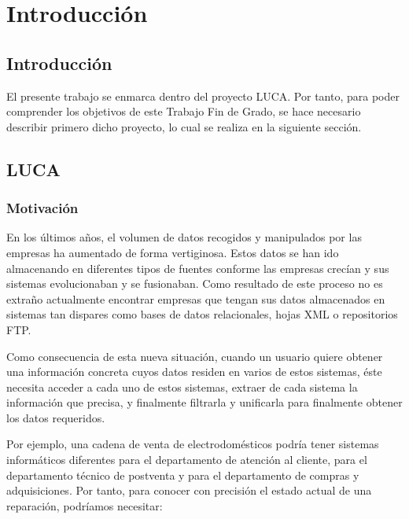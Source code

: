 \chapter{Introducción}

\minitoc
	
\section{Introducción}


El presente trabajo se enmarca dentro del proyecto LUCA. Por tanto, para poder comprender los objetivos de este Trabajo Fin de Grado, se hace necesario describir primero dicho proyecto, lo cual se realiza en la siguiente sección.

\section{LUCA}

\subsection{Motivación}

En los últimos años, el volumen de datos recogidos y manipulados por las empresas ha aumentado de forma vertiginosa. Estos datos se han ido almacenando en diferentes tipos de fuentes conforme las empresas crecían y sus sistemas evolucionaban y se fusionaban. Como resultado de  este proceso no es extraño actualmente encontrar empresas que tengan sus datos almacenados en sistemas tan dispares como bases de datos relacionales, hojas XML o repositorios FTP.

Como consecuencia de esta nueva situación, cuando un usuario quiere obtener una información concreta cuyos datos residen en varios de estos sistemas, éste necesita acceder a cada uno de estos sistemas, extraer de cada sistema la información que precisa, y finalmente filtrarla y unificarla para finalmente obtener los datos requeridos.

Por ejemplo, una cadena de venta de electrodomésticos podría tener sistemas informáticos diferentes para el departamento de atención al cliente, para el departamento técnico de postventa y para el departamento de compras y adquisiciones. Por tanto, para conocer con precisión el estado actual de una reparación, podríamos necesitar:

